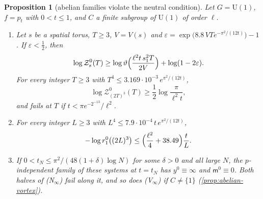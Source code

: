 \documentclass[11pt,a4paper]{amsart}
\newtheorem{proposition}[theorem]{Proposition}
\theoremstyle{definition}
\theoremstyle{remark}
\numberwithin{equation}{section}
\newcommand{\U}{\mathrm{U}}                %
\newcommand{\TT}{\mathbb{T}}               %
\newcommand{\Zc}{\mathcal{Z}}              %
\newcommand{\Vol}[1]{V(#1)}                %
\newcommand{\cube}[1]{(2#1)^3}             %
\newcommand{\hypN}{\text{\upshape(N)}}              %
\begin{document}
\begin{proposition}[abelian families violate the neutral condition]\label{prop:abelian-neutral}
Let $G=\U(1)$, $f=p_t$ with $0<t\le1$, and $C$ a finite subgroup of $\U(1)$ of order $\ell$.
\begin{enumerate}[label=\textup{(\alph*)},leftmargin=*]
\item Let $s$ be a spatial torus, $T\ge3$, $V=\Vol s$ and $\varepsilon=\exp\bigl(8.8\,VTe^{-\pi^2/(12t)}\bigr)-1$. If $\varepsilon<\frac12$, then
\[
\log\Zc^0_s(T)\ge\log\vartheta\Bigl(\frac{\ell^2t\,s_1^2T}{2V}\Bigr)+\log(1-2\varepsilon).
\]
For every integer $T\ge3$ with $T^4\le3.169\cdot10^{-3}\,e^{\pi^2/(12t)}$,
\[
\log\Zc^0_{\cube T}(T)\ge\frac12\log\frac{\pi}{\ell^2t},
\]
and \hypN{} fails at $T$ if $t<\pi e^{-2^{-13}}/\ell^2$.
\item For every integer $L\ge3$ with $L^4\le7.9\cdot10^{-4}\,t\,e^{\pi^2/(12t)}$,
\[
-\log r_1^0\bigl(\cube L\bigr)\le\Bigl(\frac{\ell^2}4+38.49\Bigr)\frac tL .
\]
\item If $0<t_N\le\pi^2/(48(1+\delta)\log N)$ for some $\delta>0$ and all large $N$, the $p$-independent family of these systems at $t=t_N$ has $y^0\equiv\infty$ and $\mathsf m^0\equiv0$. Both halves of \textup{(N$_\infty$)} fail along it, and so does \textup{(V$_\infty$)} if $C\ne\{1\}$ (\cref{prop:abelian-vortex}).
\end{enumerate}
\end{proposition}
\end{document}
